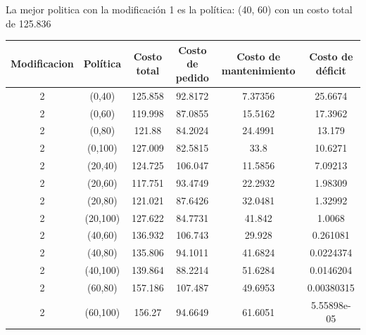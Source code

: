 \documentclass[12pt, spanish]{article}
\begin{document}
La mejor politica con la modificación 1 es la política: (40, 60) con un costo total de 125.836





\begin{table}[H]
\begin{tabular}{|c|c|c|c|c|c|}
\hline
\textbf{Modificacion} & \textbf{Política} & \textbf{Costo total} & \textbf{Costo de pedido} & \textbf{Costo de mantenimiento} & \textbf{Costo de déficit} \\ \hline
2                     & (0,40)            & 125.858              & 92.8172                  & 7.37356                         & 25.6674                   \\ \hline
2                     & (0,60)            & 119.998              & 87.0855                  & 15.5162                         & 17.3962                   \\ \hline
2                     & (0,80)            & 121.88               & 84.2024                  & 24.4991                         & 13.179                    \\ \hline
2                     & (0,100)           & 127.009              & 82.5815                  & 33.8                            & 10.6271                   \\ \hline
2                     & (20,40)           & 124.725              & 106.047                  & 11.5856                         & 7.09213                   \\ \hline
2                     & (20,60)           & 117.751              & 93.4749                  & 22.2932                         & 1.98309                   \\ \hline
2                     & (20,80)           & 121.021              & 87.6426                  & 32.0481                         & 1.32992                   \\ \hline
2                     & (20,100)          & 127.622              & 84.7731                  & 41.842                          & 1.0068                    \\ \hline
2                     & (40,60)           & 136.932              & 106.743                  & 29.928                          & 0.261081                  \\ \hline
2                     & (40,80)           & 135.806              & 94.1011                  & 41.6824                         & 0.0224374                 \\ \hline
2                     & (40,100)          & 139.864              & 88.2214                  & 51.6284                         & 0.0146204                 \\ \hline
2                     & (60,80)           & 157.186              & 107.487                  & 49.6953                         & 0.00380315                \\ \hline
2                     & (60,100)          & 156.27               & 94.6649                  & 61.6051                         & 5.55898e-05               \\ \hline
\end{tabular}
\end{table}
\end{document}
